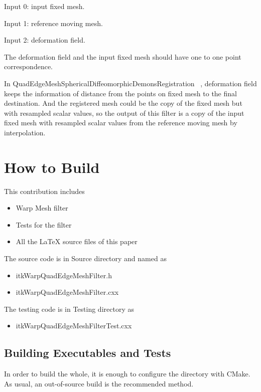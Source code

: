 \documentclass{InsightArticle}
\begin{document}
Input 0: input fixed mesh.

Input 1: reference moving mesh.

Input 2: deformation field.

The deformation field and the input fixed mesh should have one to one point correspondence.

In QuadEdgeMeshSphericalDiffeomorphicDemonsRegistration
~\cite{MeshDemonsRegistrationIJ2009}, 
deformation field keeps the information of distance from the points on fixed mesh to the 
final destination. And the registered mesh could be the copy of the fixed mesh but with 
resampled scalar values, so the output of this filter is a copy of the input fixed mesh with 
resampled scalar values from the reference moving mesh by interpolation.

\section{How to Build}

This contribution includes

\begin{itemize}
\item Warp Mesh filter
\item Tests for the filter
\item All the LaTeX source files of this paper
\end{itemize}

The source code is in Source directory and named as 

\begin{itemize}
\item itkWarpQuadEdgeMeshFilter.h
\item itkWarpQuadEdgeMeshFilter.cxx
\end{itemize}


The testing code is in Testing directory as

\begin{itemize}
\item itkWarpQuadEdgeMeshFilterTest.cxx
\end{itemize}

\subsection{Building Executables and Tests}

In order to build the whole, it is enough to configure the directory with
CMake. As usual, an out-of-source build is the recommended method.
\end{document}
